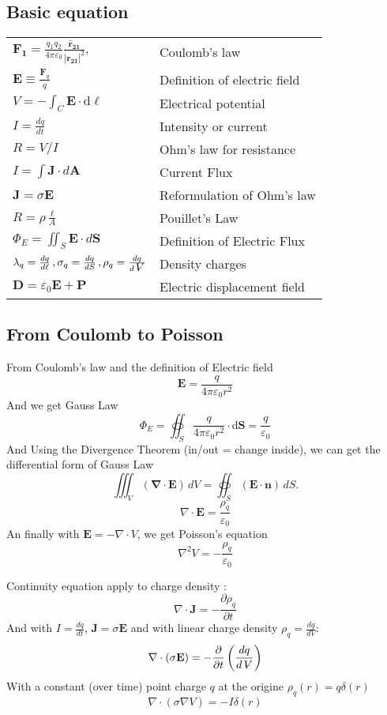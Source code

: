 \documentclass[twocolumn]{article}
\newcommand{\volume}{\mathop{\ooalign{\hfil$V$\hfil\cr\kern0.08em--\hfil\cr}}\nolimits}
\begin{document}
\subsection{Basic equation}
\begin{tabular}{@{}ll@{}}
$\boldsymbol{F_1}=\frac{q_1q_2}{4\pi\varepsilon_0} \frac{\boldsymbol{\hat{r}_{21}}}{ |\boldsymbol{r_{21}}|^2}, $ & Coulomb's law\\
$\mathbf{E}\equiv \frac{\mathbf{F}_{q}}{q}$ & Definition of electric field\\
$V = - \int_C \mathbf{E} \cdot \mathrm{d} \boldsymbol{\ell} \, $ & Electrical potential \\
$I = \frac{dq}{dt}$ & Intensity or current\\
$R = V/I$  & Ohm's law for resistance \\
$I=\int\mathbf{J}\cdot d\mathbf{A}$ & Current Flux\\
$\mathbf{J} = \sigma \mathbf{E}$ & Reformulation of Ohm's law \\
$R = \rho \frac{\ell}{A}$ & Pouillet's Law\\
$\Phi_E = \iint_S \mathbf{E} \cdot d\mathbf{S}$ & Definition of Electric Flux \\
$\lambda_q = \frac{d q}{d \ell}\,, \sigma_q = \frac{d q}{d S}\,, \rho_q =\frac{d q}{d \volume}$ & Density charges \\
$  \boldsymbol{D} = \varepsilon_0  \boldsymbol{E} +  \boldsymbol{P} $ & Electric displacement field \\
\end{tabular}

\subsection{From Coulomb to Poisson}
From Coulomb's law and the definition of Electric field
\[ \mathbf{E} = \frac{q}{4\pi\varepsilon_0 r^2}  \] 
And we get Gauss Law
\[ \Phi_E = \oiint_S \frac{q}{4\pi\varepsilon_0 r^2} \cdot \mathrm{d}\mathbf{S} = \frac{q}{\varepsilon_0}\]
And Using the Divergence Theorem (in/out = change inside), we can get the differential form of Gauss Law
\[ \iiint_V\left(\mathbf{\nabla}\cdot\mathbf{E}\right)\,dV=\oiint_S(\mathbf{E}\cdot\mathbf{n})\,dS .\]
\[\nabla \cdot \mathbf{E} = \frac{\rho_q}{\varepsilon_0}\]
An finally with $\mathbf{E} = -\nabla \cdot V$, we get Poisson's equation
 \[ {\nabla}^2 V = -\frac{\rho_q}{\varepsilon_0} \]


Continuity equation apply to charge density :
\[  \nabla \cdot \mathbf{J} = - \frac{\partial \rho_q}{ \partial t}  \]
And with $I = \frac{dq}{dt}$, $\mathbf{J} = \sigma \mathbf{E}$ and with linear charge density  $\rho_q =\frac{d q}{d V}$:
\[ \nabla \cdot (\sigma \mathbf{E}) = -\frac{\partial}{\partial t} \left(  \frac{dq}{d\volume}\right)\]
With a constant (over time) point charge $q$ at the origine $\rho_q(r) = q\delta(r)$
\[ \nabla \cdot (\sigma \nabla V) =-I \delta (r) \]
\end{document}
